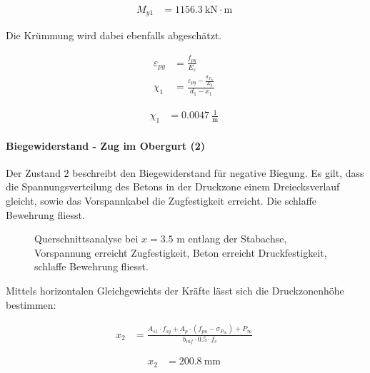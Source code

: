 \documentclass[
  11pt,
  letterpaper,
]{scrreprt}
\let\oldparagraph\paragraph
\renewcommand{\paragraph}[1]{\oldparagraph{#1}\mbox{}}
\begin{document}
$$
\begin{aligned}
M_{y1} &= 1156.3\ \mathrm{kN} \cdot \mathrm{m} \;
\end{aligned}
$$

Die Krümmung wird dabei ebenfalls abgeschätzt.

$$
\begin{aligned}
\varepsilon_{py} &= \frac{ f_{py} }{ E_{s} } \; 
\\[11pt]
\chi_{1} &= \frac{ \varepsilon_{py} - \frac{ \sigma_{P_{\infty}} }{ E_{p} } }{ d_{1} - x_{1} } \; 
\end{aligned}
$$

$$
\begin{aligned}
\chi_{1} &= 0.0047\ \frac{1}{\mathrm{m}} \;
\end{aligned}
$$

\paragraph{Biegewiderstand - Zug im Obergurt
(2)}\label{biegewiderstand---zug-im-obergurt-2}

Der Zustand \(2\) beschreibt den Biegewiderstand für negative Biegung.
Es gilt, dass die Spannungsverteilung des Betons in der Druckzone einem
Dreiecksverlauf gleicht, sowie das Vorspannkabel die Zugfestigkeit
erreicht. Die schlaffe Bewehrung fliesst.

\begin{figure}[H]


\caption{\label{fig-t6_qs_MR_pos}Querschnittsanalyse bei \(x=3.5\) m
entlang der Stabachse, Vorspannung erreicht Zugfestigkeit, Beton
erreicht Druckfestigkeit, schlaffe Bewehrung fliesst.}

\end{figure}%

Mittels horizontalen Gleichgewichts der Kräfte lässt sich die
Druckzonenhöhe bestimmen:

$$
\begin{aligned}
x_{2} &= \frac{ A_{s1} \cdot f_{sy} + A_{p} \cdot \left( f_{pu} - \sigma_{P_{\infty}} \right) + P_{\infty} }{ b_{inf} \cdot 0.5 \cdot f_{c} } \; 
\end{aligned}
$$

$$
\begin{aligned}
x_{2} &= 200.8\ \mathrm{mm} \;
\end{aligned}
$$
\end{document}
